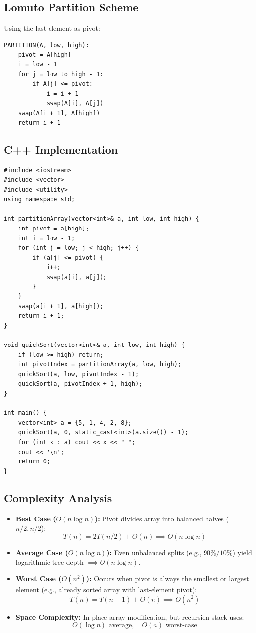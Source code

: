 \subsection{Lomuto Partition Scheme}
Using the last element as pivot:
\begin{lstlisting}[style=pseudocode, caption={Lomuto Partition Algorithm.}]
PARTITION(A, low, high):
    pivot = A[high]
    i = low - 1
    for j = low to high - 1:
        if A[j] <= pivot:
            i = i + 1
            swap(A[i], A[j])
    swap(A[i + 1], A[high])
    return i + 1
\end{lstlisting}

\subsection{C++ Implementation}

\begin{lstlisting}[style=cppstyle, caption={C++ Quick Sort Implementation.}]
#include <iostream>
#include <vector>
#include <utility>
using namespace std;

int partitionArray(vector<int>& a, int low, int high) {
    int pivot = a[high];
    int i = low - 1;
    for (int j = low; j < high; j++) {
        if (a[j] <= pivot) {
            i++;
            swap(a[i], a[j]);
        }
    }
    swap(a[i + 1], a[high]);
    return i + 1;
}

void quickSort(vector<int>& a, int low, int high) {
    if (low >= high) return;
    int pivotIndex = partitionArray(a, low, high);
    quickSort(a, low, pivotIndex - 1);
    quickSort(a, pivotIndex + 1, high);
}

int main() {
    vector<int> a = {5, 1, 4, 2, 8};
    quickSort(a, 0, static_cast<int>(a.size()) - 1);
    for (int x : a) cout << x << " ";
    cout << '\n';
    return 0;
}
\end{lstlisting}

\subsection{Complexity Analysis}
\begin{itemize}
    \item \textbf{Best Case ($O(n \log n)$):} Pivot divides array into balanced halves ($n/2, n/2$):
    \[
    T(n) = 2T(n/2) + O(n) \implies O(n \log n)
    \]
    \item \textbf{Average Case ($O(n \log n)$):} Even unbalanced splits (e.g., $90\% / 10\%$) yield logarithmic tree depth $\implies O(n \log n)$.
    \item \textbf{Worst Case ($O(n^2)$):} Occurs when pivot is always the smallest or largest element (e.g., already sorted array with last-element pivot):
    \[
    T(n) = T(n-1) + O(n) \implies O(n^2)
    \]
    \item \textbf{Space Complexity:} In-place array modification, but recursion stack uses:
    \[
    \boxed{O(\log n) \text{ average}, \quad O(n) \text{ worst-case}}
    \]
\end{itemize}

